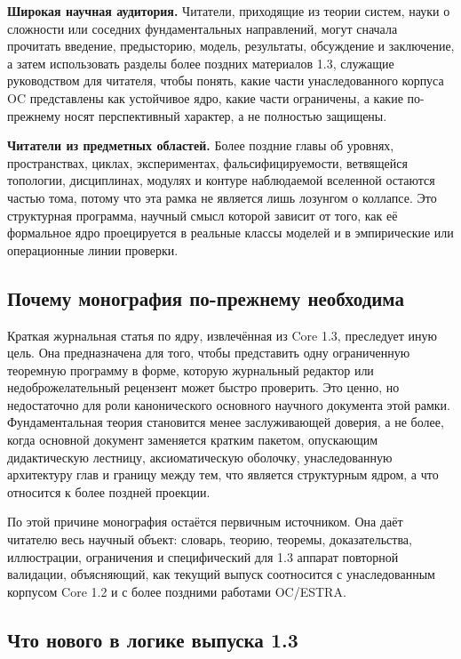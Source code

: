 \textbf{Широкая научная аудитория.}
Читатели, приходящие из теории систем, науки о сложности или соседних фундаментальных направлений, могут сначала прочитать введение, предысторию, модель, результаты, обсуждение и заключение, а затем использовать разделы более поздних материалов 1.3, служащие руководством для читателя, чтобы понять, какие части унаследованного корпуса OC представлены как устойчивое ядро, какие части ограничены, а какие по-прежнему носят перспективный характер, а не полностью защищены.

\textbf{Читатели из предметных областей.}
Более поздние главы об уровнях, пространствах, циклах, экспериментах, фальсифицируемости, ветвящейся топологии, дисциплинах, модулях и контуре наблюдаемой вселенной остаются частью тома, потому что эта рамка не является лишь лозунгом о коллапсе. Это структурная программа, научный смысл которой зависит от того, как её формальное ядро проецируется в реальные классы моделей и в эмпирические или операционные линии проверки.

\subsection{Почему монография по-прежнему необходима}

Краткая журнальная статья по ядру, извлечённая из Core 1.3, преследует иную цель.
Она предназначена для того, чтобы представить одну ограниченную теоремную программу в форме, которую журнальный редактор или недоброжелательный рецензент может быстро проверить. Это ценно, но недостаточно для роли канонического основного научного документа этой рамки. Фундаментальная теория становится менее заслуживающей доверия, а не более, когда основной документ заменяется кратким пакетом, опускающим дидактическую лестницу, аксиоматическую оболочку, унаследованную архитектуру глав и границу между тем, что является структурным ядром, а что относится к более поздней проекции.

По этой причине монография остаётся первичным источником. Она даёт читателю весь научный объект: словарь, теорию, теоремы, доказательства, иллюстрации, ограничения и специфический для 1.3 аппарат повторной валидации, объясняющий, как текущий выпуск соотносится с унаследованным корпусом Core 1.2 и с более поздними работами OC/ESTRA.

\subsection{Что нового в логике выпуска 1.3}

